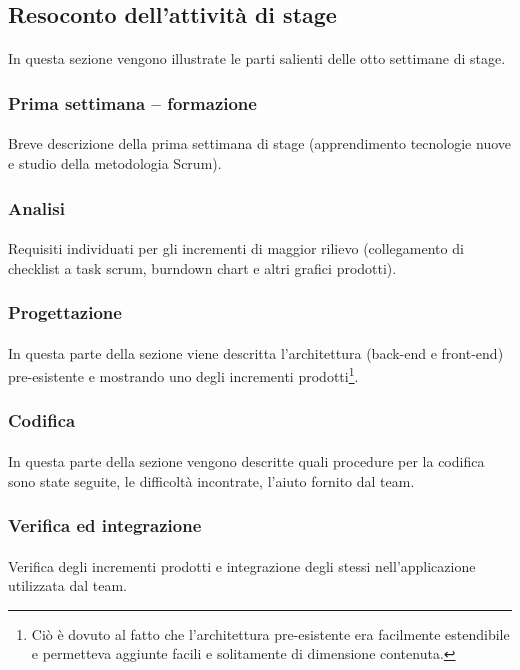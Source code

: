 \documentclass[
article,
10pt, %
oneside, %
BCOR5mm, %
]{scrartcl}
\begin{document}
\subsection{Resoconto dell'attività di stage}
\paragraph{} In questa sezione vengono illustrate le parti salienti delle otto
settimane di stage.

\subsubsection{Prima settimana -- formazione}
\paragraph{} Breve descrizione della prima settimana di stage (apprendimento
tecnologie nuove e studio della metodologia Scrum).

\subsubsection{Analisi}
\paragraph{} Requisiti individuati per gli incrementi di maggior rilievo
(collegamento di checklist a task scrum, burndown chart e altri grafici
prodotti).

\subsubsection{Progettazione}
\paragraph{} In questa parte della sezione viene descritta l'architettura
(back-end e front-end) pre-esistente e mostrando uno degli incrementi
prodotti\footnote{Ciò è dovuto al fatto che l'architettura pre-esistente era
facilmente estendibile e permetteva aggiunte facili e solitamente di
dimensione contenuta.}.

\subsubsection{Codifica}
\paragraph{} In questa parte della sezione vengono descritte quali procedure
per la codifica sono state seguite, le difficoltà incontrate, l'aiuto fornito
dal team.

\subsubsection{Verifica ed integrazione}
\paragraph{} Verifica degli incrementi prodotti e integrazione degli stessi
nell'applicazione utilizzata dal team.
\end{document}
